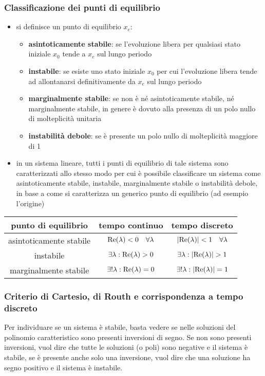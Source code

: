 \subsubsection*{Classificazione dei punti di equilibrio}
\begin{itemize}
	\item si definisce un punto di equilibrio \(x_e\):
	\begin{itemize}
		\item \textbf{asintoticamente stabile}: se l'evoluzione libera per qualsiasi stato iniziale \(x_0\) tende a \(x_e\)
		sul lungo periodo
		\item \textbf{instabile}: se esiste uno stato iniziale \(x_0\) per cui l'evoluzione libera tende ad allontanarsi
		definitivamente da \(x_e\) sul lungo periodo
		\item \textbf{marginalmente stabile}: se non è né asintoticamente stabile, né marginalmente stabile, in genere è
		dovuto alla presenza di un polo nullo di molteplicità unitaria
		\item \textbf{instabilità debole}: se è presente un polo nullo di molteplicità maggiore di 1
	\end{itemize}
	\item in un sistema lineare, tutti i punti di equilibrio di tale sistema sono caratterizzati allo stesso modo per cui è possibile
	classificare un sistema come asintoticamente stabile, instabile, marginalmente stabile o instabilità debole, in base a come
	si caratterizza un generico punto di equilibrio (ad esempio l'origine)
\end{itemize}
\begin{center}
	\begin{tabularx}{\textwidth}{C | C | C}
		\textbf{punto di equilibrio} & \textbf{tempo continuo} & \textbf{tempo discreto} \\
		\toprule
		asintoticamente stabile & \(\text{Re}(\lambda) < 0 \quad \forall \lambda\) & \(\left|\text{Re}(\lambda)\right| < 1 \quad \forall \lambda\) \\
		\midrule
		instabile & \(\exists \lambda : \text{Re}(\lambda) > 0\) & \(\exists \lambda : \left|\text{Re}(\lambda)\right| > 1\) \\
		\midrule
		marginalmente stabile & \(\exists! \lambda : \text{Re}(\lambda) = 0\) & \(\exists! \lambda : \left|\text{Re}(\lambda)\right| = 1\) \\
	\end{tabularx}
\end{center}

\subsubsection*{Criterio di Cartesio, di Routh e corrispondenza a tempo discreto}
Per individuare se un sistema è stabile, basta vedere se nelle soluzioni del polinomio caratteristico sono presenti inversioni
di segno. Se non sono presenti inversioni, vuol dire che tutte le soluzioni (o poli) sono negative e il sistema è stabile, se
è presente anche solo una inversione, vuol dire che una soluzione ha segno positivo e il sistema è instabile.

